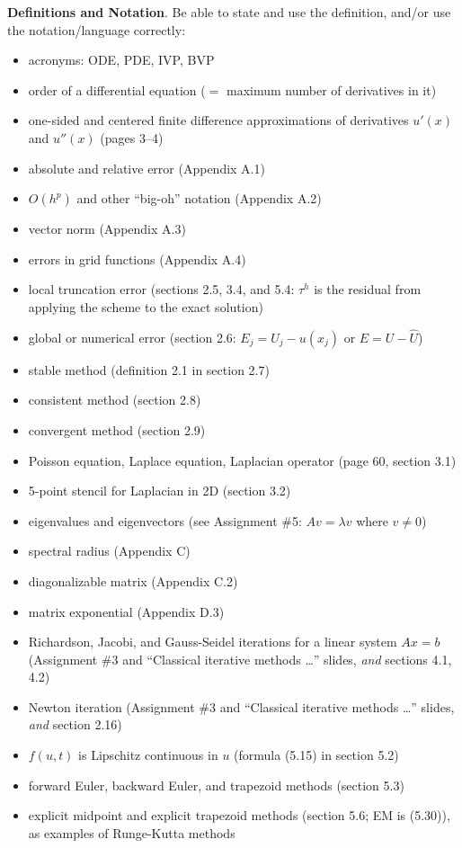 \documentclass[12pt]{amsart}
\newcommand{\bigspacing}{\renewcommand{\baselinestretch}{1.15}\tiny\normalsize}
\begin{document}
\bigspacing
\noindent \textbf{Definitions and Notation}.  Be able to state and use the definition, and/or use the notation/language correctly:
\begin{itemize}
\item acronyms: ODE, PDE, IVP, BVP
\item order of a differential equation ($=$ maximum number of derivatives in it)
\item one-sided and centered finite difference approximations of derivatives $u'(x)$ and $u''(x)$ (pages 3--4)
\item absolute and relative error (Appendix A.1)
\item $O(h^p)$ and other ``big-oh'' notation (Appendix A.2)
\item vector norm (Appendix A.3)
\item errors in grid functions (Appendix A.4)
\item local truncation error (sections 2.5, 3.4, and 5.4: $\tau^h$ is the residual from applying the scheme to the exact solution)
\item global or numerical error (section 2.6: $E_j = U_j - u(x_j)$ or $E = U - \hat U$)
\item stable method (definition 2.1 in section 2.7)
\item consistent method (section 2.8)
\item convergent method (section 2.9)
\item Poisson equation, Laplace equation, Laplacian operator (page 60, section 3.1)
\item 5-point stencil for Laplacian in 2D (section 3.2)
\item eigenvalues and eigenvectors (see Assignment \#5: $A v = \lambda v$ where $v\ne 0$)
\item spectral radius (Appendix C)
\item diagonalizable matrix (Appendix C.2)
\item matrix exponential (Appendix D.3)
\item Richardson, Jacobi, and Gauss-Seidel iterations for a linear system $Ax=b$ (Assignment \#3 and ``Classical iterative methods \dots'' slides, \emph{and} sections 4.1, 4.2)
\item Newton iteration (Assignment \#3 and ``Classical iterative methods \dots'' slides, \emph{and} section 2.16)
\item $f(u,t)$ is Lipschitz continuous in $u$ (formula (5.15) in section 5.2)
\item forward Euler, backward Euler, and trapezoid methods (section 5.3)
\item explicit midpoint and explicit trapezoid methods (section 5.6; EM is (5.30)), as examples of Runge-Kutta methods
\end{itemize}
\end{document}
